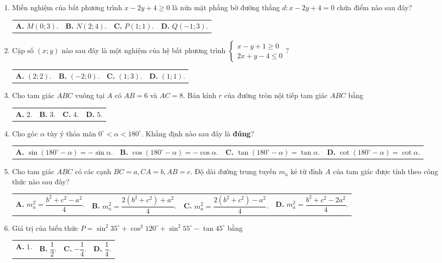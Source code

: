 \documentclass[12pt,a4paper]{article}
\makeatletter
\newcommand{\four}[4]{\par\noindent\begin{tabularx}{\linewidth}{@{}*{4}{>{\raggedright\arraybackslash}X}@{}}\textbf{A.} #1&\textbf{B.} #2&\textbf{C.} #3&\textbf{D.} #4\end{tabularx}}
\makeatother
\begin{document}
\begin{enumerate}
\item Miền nghiệm của bất phương trình $x - 2y + 4 \ge 0$ là nửa mặt phẳng bờ đường thẳng $d: x - 2y + 4 = 0$ chứa điểm nào sau đây?
\four{$M(0; 3)$.}{$N(2; 4)$.}{$P(1; 1)$.}{$Q(-1; 3)$.}

\item Cặp số $(x; y)$ nào sau đây là một nghiệm của hệ bất phương trình $\begin{cases} x - y + 1 \ge 0 \\ 2x + y - 4 \le 0 \end{cases}$?
\four{$(2; 2)$.}{$(-2; 0)$.}{$(1; 3)$.}{$(1; 1)$.}

\item Cho tam giác $ABC$ vuông tại $A$ có $AB = 6$ và $AC = 8$. Bán kính $r$ của đường tròn nội tiếp tam giác $ABC$ bằng
\four{$2$.}{$3$.}{$4$.}{$5$.}

\item Cho góc $\alpha$ tùy ý thỏa mãn $0^\circ < \alpha < 180^\circ$. Khẳng định nào sau đây là \textbf{đúng}?
\four{$\sin(180^\circ - \alpha) = -\sin \alpha$.}{$\cos(180^\circ - \alpha) = -\cos \alpha$.}{$\tan(180^\circ - \alpha) = \tan \alpha$.}{$\cot(180^\circ - \alpha) = \cot \alpha$.}

\item Cho tam giác $ABC$ có các cạnh $BC = a, CA = b, AB = c$. Độ dài đường trung tuyến $m_a$ kẻ từ đỉnh $A$ của tam giác được tính theo công thức nào sau đây?
\four{$m_a^2 = \dfrac{b^2 + c^2 - a^2}{4}$.}{$m_a^2 = \dfrac{2(b^2 + c^2) + a^2}{4}$.}{$m_a^2 = \dfrac{2(b^2 + c^2) - a^2}{4}$.}{$m_a^2 = \dfrac{b^2 + c^2 - 2a^2}{4}$.}

\item Giá trị của biểu thức $P = \sin^2 35^\circ + \cos^2 120^\circ + \sin^2 55^\circ - \tan 45^\circ$ bằng
\four{$1$.}{$\dfrac{1}{2}$.}{$-\dfrac{1}{4}$.}{$\dfrac{1}{4}$.}
\end{enumerate}
\end{document}
